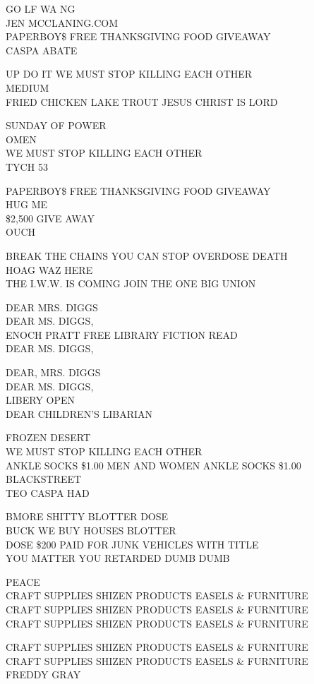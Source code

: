 \documentclass[10pt,letterpaper]{article}
\begin{document}
GO LF WA NG\\
JEN MCCLANING.COM\\
PAPERBOY\$ FREE THANKSGIVING FOOD GIVEAWAY\\
CASPA ABATE

UP DO IT WE MUST STOP KILLING EACH OTHER\\
MEDIUM\\
FRIED CHICKEN LAKE TROUT JESUS CHRIST IS LORD

SUNDAY OF POWER\\
OMEN\\
WE MUST STOP KILLING EACH OTHER\\
TYCH 53

PAPERBOY\$ FREE THANKSGIVING FOOD GIVEAWAY\\
HUG ME\\
\$2,500 GIVE AWAY\\
OUCH

BREAK THE CHAINS YOU CAN STOP OVERDOSE DEATH\\
HOAG WAZ HERE\\
THE I.W.W. IS COMING JOIN THE ONE BIG UNION

DEAR MRS. DIGGS\\
DEAR MS. DIGGS,\\
ENOCH PRATT FREE LIBRARY FICTION READ\\
DEAR MS. DIGGS,

DEAR, MRS. DIGGS\\
DEAR MS. DIGGS,\\
LIBERY OPEN\\
DEAR CHILDREN'S LIBARIAN

FROZEN DESERT\\
WE MUST STOP KILLING EACH OTHER\\
ANKLE SOCKS \$1.00 MEN AND WOMEN ANKLE SOCKS \$1.00 BLACKSTREET\\
TEO CASPA HAD

BMORE SHITTY BLOTTER DOSE\\
BUCK WE BUY HOUSES BLOTTER\\
DOSE \$200 PAID FOR JUNK VEHICLES WITH TITLE\\
YOU MATTER YOU RETARDED DUMB DUMB

PEACE\\
CRAFT SUPPLIES SHIZEN PRODUCTS EASELS \& FURNITURE\\
CRAFT SUPPLIES SHIZEN PRODUCTS EASELS \& FURNITURE\\
CRAFT SUPPLIES SHIZEN PRODUCTS EASELS \& FURNITURE

CRAFT SUPPLIES SHIZEN PRODUCTS EASELS \& FURNITURE\\
CRAFT SUPPLIES SHIZEN PRODUCTS EASELS \& FURNITURE\\
FREDDY GRAY
\pagebreak
\end{document}
